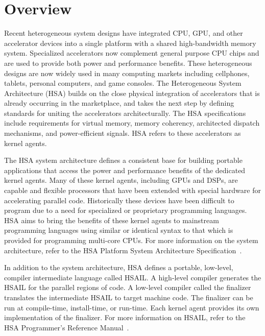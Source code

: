 \documentclass[final,oneside]{book}
\begin{document}
\section{Overview}\label{overview}
\vspace{-3mm}
Recent heterogeneous system designs have integrated CPU, GPU, and other
accelerator devices into a single platform with a shared high-bandwidth memory
system.  Specialized accelerators now complement general purpose CPU chips and
are used to provide both power and performance benefits.  These
heterogeneous designs are now widely used in many computing markets including
cellphones, tablets, personal computers, and game consoles. The Heterogeneous
System Architecture (HSA) builds on the close physical integration of
accelerators that is already occurring in the marketplace, and takes the next
step by defining standards for uniting the accelerators architecturally. The HSA
specifications include requirements for virtual memory, memory coherency,
architected dispatch mechanisms, and power-efficient signals. HSA refers to
these accelerators as kernel agents.

The HSA system architecture defines a consistent base for building portable
applications that access the power and performance benefits of the dedicated
kernel agents. Many of these kernel agents, including GPUs and DSPs, are capable
and flexible processors that have been extended with special hardware for
accelerating parallel code. Historically these devices have been difficult to
program due to a need for specialized or proprietary programming languages. HSA
aims to bring the benefits of these kernel agents to mainstream programming
languages using similar or identical syntax to that which is provided for
programming multi-core CPUs. For more information on the system architecture,
refer to the HSA Platform System Architecture Specification~\cite{sar}.

In addition to the system architecture, HSA defines a portable, low-level,
compiler intermediate language called HSAIL.  A high-level compiler
generates the HSAIL for the parallel regions of code. A low-level compiler
called the finalizer translates the intermediate HSAIL to target machine
code. The finalizer can be run at compile-time, install-time, or run-time. Each
kernel agent provides its own implementation of the finalizer.  For more
information on HSAIL, refer to the HSA Programmer's Reference Manual~\cite{prm}.
\end{document}
